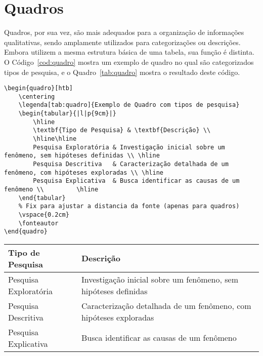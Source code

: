 \documentclass[
    12pt
    ,oneside
    ,a4paper
    ,chapter=TITLE
    ,section=TITLE
    ,sumario=abnt-6027-2012]{abntex2}
\begin{document}
\section{Quadros}

Quadros, por sua vez, são mais adequados para a organização de informações qualitativas, sendo amplamente utilizados para categorizações ou descrições. Embora utilizem a mesma estrutura básica de uma tabela, sua função é distinta. O Código~\ref{cod:quadro} mostra um exemplo de quadro no qual são categorizados tipos de pesquisa, e o Quadro~\ref{tab:quadro} mostra o resultado deste código.

\begin{codigo}[htb]
\begin{lstlisting}
\begin{quadro}[htb]
    \centering
    \legenda[tab:quadro]{Exemplo de Quadro com tipos de pesquisa}
    \begin{tabular}{|l|p{9cm}|}
        \hline
        \textbf{Tipo de Pesquisa} & \textbf{Descrição} \\ 
        \hline\hline
        Pesquisa Exploratória & Investigação inicial sobre um fenômeno, sem hipóteses definidas \\ \hline
        Pesquisa Descritiva   & Caracterização detalhada de um fenômeno, com hipóteses exploradas \\ \hline
        Pesquisa Explicativa  & Busca identificar as causas de um fenômeno \\         \hline
    \end{tabular}
    % Fix para ajustar a distancia da fonte (apenas para quadros)
    \vspace{0.2cm} 
    \fonteautor
\end{quadro}
\end{lstlisting}
\fonteautor
\end{codigo}


\begin{quadro}[htb]
    \centering
    \begin{tabular}{|l|p{9cm}|}
        \hline
        \textbf{Tipo de Pesquisa} & \textbf{Descrição} \\ 
        \hline\hline
        Pesquisa Exploratória & Investigação inicial sobre um fenômeno, sem hipóteses definidas \\ \hline
        Pesquisa Descritiva   & Caracterização detalhada de um fenômeno, com hipóteses exploradas \\ \hline
        Pesquisa Explicativa  & Busca identificar as causas de um fenômeno \\ \hline
    \end{tabular}
    \vspace{0.2cm} %
    \fonteautor
\end{quadro}
\end{document}
